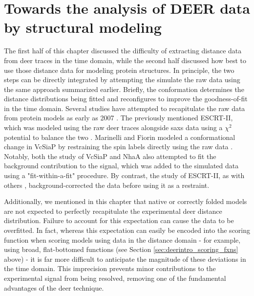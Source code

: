 \section{Towards the analysis of DEER data by structural modeling}\label{sec:deerintro_usingrawdata}

The first half of this chapter discussed the difficulty of extracting distance data from \gls{deer} traces in the time domain, while the second half discussed how best to use those distance data for modeling protein structures. In principle, the two steps can be directly integrated by attempting the simulate the raw data using the same approach summarized earlier. Briefly, the conformation determines the distance distributions being fitted and reconfigures to improve the goodness-of-fit in the time domain. Several studies have attempted to recapitulate the raw data from protein models as early as 2007 \citep*{Bhatnagar2007, Hilger2007}. The previously mentioned ESCRT-II, which was modeled using the raw \gls{deer} traces alongside \gls{saxs} data using a $\chi^2$ potential to balance the two \citep*{Boura2012, Boura2011}. Marinelli and Fiorin modeled a conformational change in VcSiaP by restraining the spin labels directly using the raw data \citep*{Marinelli2019}. Notably, both the study of VcSiaP and NhaA also attempted to fit the background contribution to the signal, which was added to the simulated data using a "fit-within-a-fit" procedure. By contrast, the study of ESCRT-II, as with others \citep*{Reichel2018}, background-corrected the data before using it as a restraint.

Additionally, we mentioned in this chapter that native or correctly folded models are not expected to perfectly recapitulate the experimental \gls{deer} distance distribution. Failure to account for this expectation can cause the data to be overfitted. In fact, whereas this expectation can easily be encoded into the scoring function when scoring models using data in the distance domain - for example, using broad, flat-bottomed functions (see Section \ref{sec:deerintro_scoring_fxns} above) - it is far more difficult to anticipate the magnitude of these deviations in the time domain. This imprecision prevents minor contributions to the experimental signal from being resolved, removing one of the fundamental advantages of the \gls{deer} technique.

